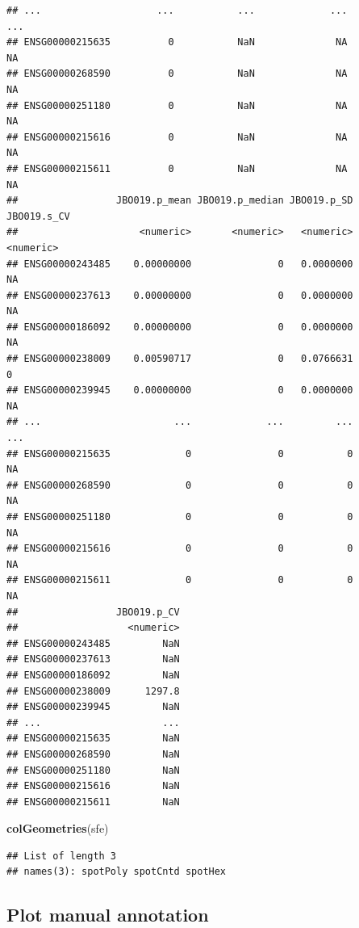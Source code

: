 \documentclass[
]{book}
\newenvironment{Shaded}{\begin{snugshade}}{\end{snugshade}}
\newcommand{\FunctionTok}[1]{\textcolor[rgb]{0.13,0.29,0.53}{\textbf{#1}}}
\newcommand{\NormalTok}[1]{#1}
\begin{document}
\begin{verbatim}
## ...                    ...           ...             ...         ...
## ENSG00000215635          0           NaN              NA          NA
## ENSG00000268590          0           NaN              NA          NA
## ENSG00000251180          0           NaN              NA          NA
## ENSG00000215616          0           NaN              NA          NA
## ENSG00000215611          0           NaN              NA          NA
##                 JBO019.p_mean JBO019.p_median JBO019.p_SD JBO019.s_CV
##                     <numeric>       <numeric>   <numeric>   <numeric>
## ENSG00000243485    0.00000000               0   0.0000000          NA
## ENSG00000237613    0.00000000               0   0.0000000          NA
## ENSG00000186092    0.00000000               0   0.0000000          NA
## ENSG00000238009    0.00590717               0   0.0766631           0
## ENSG00000239945    0.00000000               0   0.0000000          NA
## ...                       ...             ...         ...         ...
## ENSG00000215635             0               0           0          NA
## ENSG00000268590             0               0           0          NA
## ENSG00000251180             0               0           0          NA
## ENSG00000215616             0               0           0          NA
## ENSG00000215611             0               0           0          NA
##                 JBO019.p_CV
##                   <numeric>
## ENSG00000243485         NaN
## ENSG00000237613         NaN
## ENSG00000186092         NaN
## ENSG00000238009      1297.8
## ENSG00000239945         NaN
## ...                     ...
## ENSG00000215635         NaN
## ENSG00000268590         NaN
## ENSG00000251180         NaN
## ENSG00000215616         NaN
## ENSG00000215611         NaN
\end{verbatim}

\begin{Shaded}
\begin{Highlighting}[]
\FunctionTok{colGeometries}\NormalTok{(sfe)}
\end{Highlighting}
\end{Shaded}

\begin{verbatim}
## List of length 3
## names(3): spotPoly spotCntd spotHex
\end{verbatim}

\hypertarget{plot-manual-annotation}{%
\subsection{Plot manual annotation}\label{plot-manual-annotation}}
\end{document}
